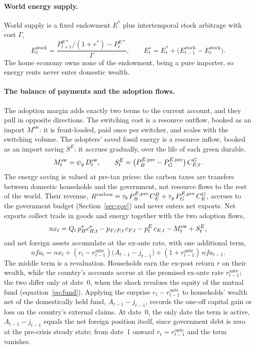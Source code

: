 \paragraph{World energy supply.}
World supply is a fixed endowment $E^{*}$ plus intertemporal stock
arbitrage with cost $\Gamma$,
%
\begin{equation}
E^{\mathrm{stock}}_t=\frac{P^{E*}_{t+1}/(1+r^{*})-P^{E*}_t}{\Gamma},
\qquad
E^{s}_t=E^{*}_t
+\bigl(E^{\mathrm{stock}}_{t-1}-E^{\mathrm{stock}}_t\bigr).
\label{eq:energy-supply}
\end{equation}
%
The home economy owns none of the endowment, being a pure importer, so energy
rents never enter domestic wealth.

\paragraph{The balance of payments and the adoption flows.}
The adoption margin adds exactly two terms to the current account, and they pull
in opposite directions. The switching cost is a resource outflow, booked as an
import $M^{\mathrm{sw}}$: it is front-loaded, paid once per switcher, and scales with
the switching volume. The adopters' saved fossil energy is a resource inflow, booked
as an import saving $S^{E}$: it accrues gradually, over the life of each green
durable,
%
\begin{equation}
M^{\mathrm{sw}}_t=\psi_g\,D^{\mathrm{sw}}_t,
\qquad
S^{E}_t=\bigl(P^{E,\mathrm{pre}}_{B}-P^{E,\mathrm{pre}}_{G}\bigr)\,C^{G}_{E,t}.
\label{eq:adoption-flows}
\end{equation}
%
The energy saving is valued at pre-tax prices: the carbon taxes are transfers
between domestic households and the government, not resource flows to the rest
of the world. Their revenue,
$R^{\mathrm{carbon}}=\tau_b\,P^{E,\mathrm{pre}}_{B}\,C^B_E+\tau_g\,P^{E,\mathrm{pre}}_{G}\,C^G_E$, accrues to
the government budget (Section~\ref{sec:gov}) and never enters net exports.
Net exports collect trade in goods and energy together with the two adoption
flows,
%
\begin{equation}
nx_t = Q_t\,p^{*}_H c^{*}_{H,t} - p_{F/P,t}\,c_{F,t} - p^{E}_t\,c_{E,t}
- M^{\mathrm{sw}}_t + S^{E}_t,
\label{eq:nx}
\end{equation}
%
and net foreign assets accumulate at the ex-ante rate, with one additional term,
%
\begin{equation}
nfa_t = nx_t + (r_t-r^{\mathrm{ante}}_{t-1})\bigl(A_{t-1}-j_{t-1}\bigr)
+ (1+r^{\mathrm{ante}}_{t-1})\,nfa_{t-1}.
\label{eq:nfa}
\end{equation}
%
The middle term is a revaluation. Households earn the
ex-post return $r$ on their wealth, while the country's accounts accrue at the
promised ex-ante rate $r^{\mathrm{ante}}_{t-1}$; the two differ only at date~0, when
the shock revalues the equity of the mutual fund (equation~\eqref{eq:fund}).
Applying the surprise $r_t-r^{\mathrm{ante}}_{t-1}$ to households' wealth net of the
domestically held fund, $A_{t-1}-j_{t-1}$, records the one-off capital
gain or loss on the country's external claims. At date~0, the only date the term is
active, $A_{t-1}-j_{t-1}$ equals the net foreign position itself, since
government debt is zero at the pre-crisis steady state; from date~1 onward
$r_t=r^{\mathrm{ante}}_{t-1}$ and the term vanishes.

